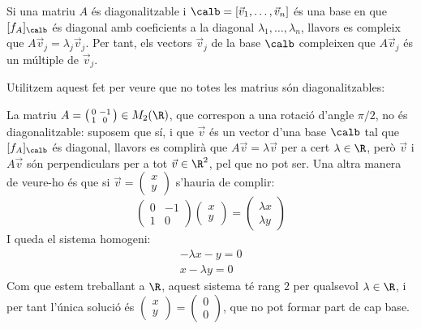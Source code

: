 \begin{observacio}\label{obs:diagonalitzables}
Si una matriu $A$ és diagonalitzable i $\calb=[\vec v_1, \dots, \vec v_n]$ és una base en que $[f_A]_\calb$ és diagonal amb coeficients a la diagonal $\lambda_1, \dots, \lambda_n$, llavors es compleix que $A \vec v_j=\lambda_j \vec v_j$. Per tant, els vectors $\vec v_j$ de la base $\calb$ compleixen que $A\vec v_j$ és un múltiple de $\vec v_j$.
\end{observacio}
Utilitzem aquest fet per veure que no totes les matrius són diagonalitzables: 
\begin{exemple}
La matriu $A=\left(\begin{smallmatrix} 0 & -1 \\ 1 & 0\end{smallmatrix}\right)\in M_2(\R)$, que correspon a una rotació d'angle $\pi/2$, no és diagonalitzable: suposem que sí, i que $\vec v$ és un vector d'una base $\calb$ tal que $[f_A]_\calb$ és diagonal, llavors es complirà que $A\vec v=\lambda \vec v$ per a cert $\lambda\in \R$, però $\vec v$ i $A\vec v$ són perpendiculars per a tot $\vec v \in \R^2$, pel que no pot ser. Una altra manera de veure-ho és que si $\vec v=\left(\begin{smallmatrix} x \\ y \end{smallmatrix}\right)$ s'hauria de complir:
$$
\begin{pmatrix}
0 & -1 \\ 1 & 0 
\end{pmatrix}
\begin{pmatrix}
x \\ y 
\end{pmatrix} =
\begin{pmatrix}
\lambda x \\ \lambda y 
\end{pmatrix}
$$
I queda el sistema homogeni:
\begin{align*}
    -\lambda x - y =0 \\
    x - \lambda y=0
\end{align*}
Com que estem treballant a $\R$, aquest sistema té rang $2$ per qualsevol $\lambda\in\R$, i per tant l'única solució és $\left(\begin{smallmatrix} x \\ y \end{smallmatrix}\right)=\left(\begin{smallmatrix} 0 \\ 0 \end{smallmatrix}\right)$, que no pot formar part de cap base.
\end{exemple}

